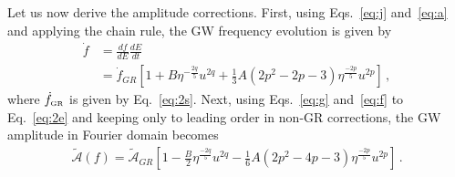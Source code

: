 \documentclass[prd,twocolumn,nofootinbib]{revtex4-1}
\newcommand{\GR}{{\mbox{\tiny GR}}}
\begin{document}
 Let us now derive the amplitude corrections. First, using Eqs.~\eqref{eq:j} and~\eqref{eq:a} and applying the chain rule, the GW frequency evolution is given by
 \begin{align}\label{eq:f}
 \dot{f}&=\frac{df}{dE}\frac{dE}{dt}\nonumber\\ &=\dot{f}_{GR}\left[1+B\eta^{-\frac{2q}{5}} u^{2q}+\frac{1}{3}A(2p^2-2p-3)\eta^{\frac{-2p}{5}}u^{2p} \right]\,,
 \end{align}
where $\dot{f}_{\GR}$ is given by Eq.~\eqref{eq:2s}. 
Next, using Eqs.~\eqref{eq:g} and~\eqref{eq:f} to Eq.~\eqref{eq:2e} and keeping only to leading order in non-GR corrections, the GW amplitude in Fourier domain becomes
\begin{align}\label{eq:o2}
\tilde{\mathcal{A}}(f)=\tilde{\mathcal{A}}_{GR} \left[1-\frac{B}{2}\eta^{\frac{-2q}{5}}u^{2q}-\frac{1}{6}A(2p^2-4p-3)\eta^{\frac{-2p}{5}}u^{2p}\right]\,.
\end{align}
\end{document}
